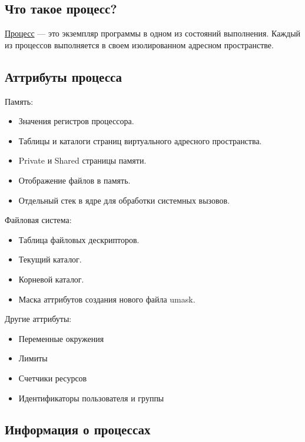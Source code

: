 \begin{multicols}{2}
    \subsection*{Что такое процесс?}

    \begin{definition}{}{}
      \underline{Процесс} --- это экземпляр программы в одном из состояний выполнения. Каждый
      из процессов выполняется в своем изолированном адресном пространстве.
    \end{definition}
    
    \subsection*{Аттрибуты процесса}
    
    Память:
    \begin{itemize}
      \item Значения регистров процессора.
      \item Таблицы и каталоги страниц виртуального адресного пространства.
      \item Private и Shared страницы памяти.
      \item Отображение файлов в память.
      \item Отдельный стек в ядре для обработки системных вызовов.
    \end{itemize}
    
    Файловая система:
    \begin{itemize}
      \item Таблица файловых дескрипторов.
      \item Текущий каталог.
      \item Корневой каталог.
      \item Маска аттрибутов создания нового файла umask. 
    \end{itemize}
    
    Другие аттрибуты:
    \begin{itemize}
      \item Переменные окружения
      \item Лимиты
      \item Счетчики ресурсов
      \item Идентификаторы пользователя и группы
    \end{itemize}
    
    \subsection*{Информация о процессах}
    

\end{multicols}

